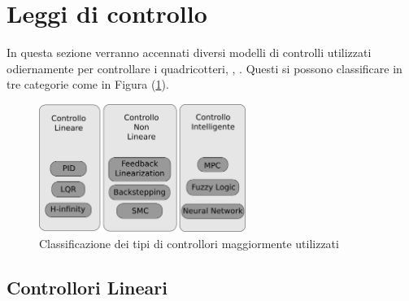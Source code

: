 \section{Leggi di controllo}
In questa sezione verranno accennati diversi modelli di controlli utilizzati odiernamente per controllare i quadricotteri, \cite{ZuluAndrew2014ARoC}, \cite{KimJinho2020ACSo}. Questi si possono classificare in tre categorie come in Figura (\ref{fig:categoriecontrolli}).
\begin{figure}
	\centering
	\includegraphics[width=0.6\textwidth]{SistemaQuadrirotore/Figure/Classificazione}
	\caption{Classificazione dei tipi di controllori maggiormente utilizzati \cite{KimJinho2020ACSo}}
	\label{fig:categoriecontrolli}
\end{figure}


\subsection{Controllori Lineari}
